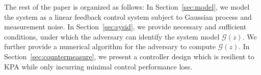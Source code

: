 
The rest of the paper is organized as follows: In Section~\ref{sec:model}, we model the system as a linear feedback control system subject to Gaussian process and measurement noise. In Section~\ref{sec:sysid}, we provide necessary and sufficient conditions, under which the adversary can identify the system model $\mathcal G(z)$. We further provide a numerical algorithm for the adversary to compute $\mathcal G(z)$. In Section~\ref{sec:countermeasure}, we present a controller design which is resilient to KPA while only incurring minimal control performance loss. 

